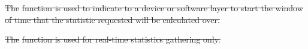 \documentclass[12pt]{report} %
\providecommand{\DIFdeltex}[1]{{\protect\color{red}\sout{#1}}}                      %
\providecommand{\DIFaddend}{} %
\providecommand{\DIFdelbegin}{} %
\providecommand{\DIFdel}[1]{\texorpdfstring{\DIFdeltex{#1}}{}} %
\newcommand{\DIFscaledelfig}{0.5}
\newlength{\DIFdelgraphicswidth} %
\newlength{\DIFdelgraphicsheight} %
\newcommand{\DIFdelincludegraphics}[2][]{%
\sbox{\DIFdelgraphicsbox}{\DIFOincludegraphics[#1]{#2}}%
\settoboxwidth{\DIFdelgraphicswidth}{\DIFdelgraphicsbox} %
\settoboxtotalheight{\DIFdelgraphicsheight}{\DIFdelgraphicsbox} %
\scalebox{\DIFscaledelfig}{%
\parbox[b]{\DIFdelgraphicswidth}{\usebox{\DIFdelgraphicsbox}\\[-\baselineskip] \rule{\DIFdelgraphicswidth}{0em}}\llap{\resizebox{\DIFdelgraphicswidth}{\DIFdelgraphicsheight}{%
\setlength{\unitlength}{\DIFdelgraphicswidth}%
\begin{picture}(1,1)%
\thicklines\linethickness{2pt} %
{\color[rgb]{1,0,0}\put(0,0){\framebox(1,1){}}}%
{\color[rgb]{1,0,0}\put(0,0){\line( 1,1){1}}}%
{\color[rgb]{1,0,0}\put(0,1){\line(1,-1){1}}}%
\end{picture}%
}\hspace*{3pt}}} %
} %
\DeclareRobustCommand{\DIFaddend}{\DIFOaddend \let\includegraphics\DIFOincludegraphics} %
\DeclareRobustCommand{\DIFdelbegin}{\DIFOdelbegin \let\includegraphics\DIFdelincludegraphics} %
\begin{document}
\DIFaddend %
\DIFdelbegin %
\DIFdel{The }%
\DIFdel{function is used to indicate to a device or software layer to start the window of time that the statistic requested will be calculated over.
}%

\DIFdel{The }%
\DIFdel{function is used for real-time statistics gathering only.
}%

\end{document}

